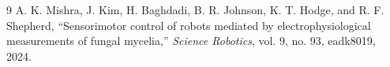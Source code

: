 \documentclass[11pt,a4paper]{article}
\begin{document}
\begin{thebibliography}{9}
A. K. Mishra, J. Kim, H. Baghdadi, B. R. Johnson, K. T. Hodge, and R. F. Shepherd,
``Sensorimotor control of robots mediated by electrophysiological measurements of fungal mycelia,''
\emph{Science Robotics}, vol. 9, no. 93, eadk8019, 2024.
\end{thebibliography}
\end{document}

